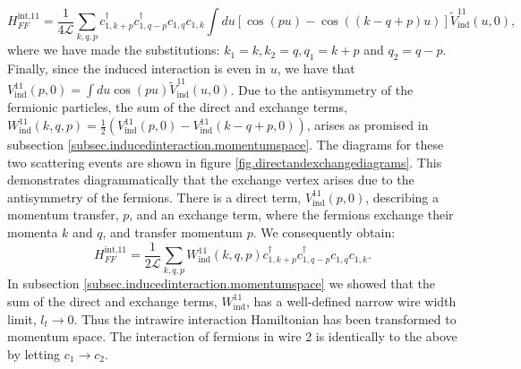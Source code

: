 \begin{equation}
H^\text{int,11}_{FF} = \frac{1}{4\mathcal{L}} \sum_{k, q, p} c^\dagger_{1, k + p}c^\dagger_{1, q - p}c_{1, q}c_{1, k} \int du\left[\cos\left(pu\right) - \cos\left(\left( k - q + p \right)u\right)\right]\tilde{V}^{11}_{\text{ind}}(u,0), \nonumber
\end{equation}
where we have made the substitutions: $k_1 = k, k_2 = q, q_1 = k + p$ and $q_2 = q - p$. Finally, since the induced interaction is even in $u$, we have that $V^{11}_{\text{ind}}(p, 0) = \int du \cos(pu) \tilde{V}^{11}_{\text{ind}}(u, 0)$. Due to the antisymmetry of the fermionic particles, the sum of the direct and exchange terms, $W^{11}_{\text{ind}}(k, q, p) = \frac{1}{2}\left( V^{11}_{\text{ind}}\left( p, 0 \right) - V^{11}_{\text{ind}}\left( k - q + p, 0 \right) \right)$, arises as promised in subsection \ref{subsec.inducedinteraction.momentumspace}. The diagrams for these two scattering events are shown in figure \ref{fig.directandexchangediagrams}. This demonstrates diagrammatically that the exchange vertex arises due to the antisymmetry of the fermions. There is a direct term, $V^{11}_\text{ind}\left( p, 0 \right)$, describing a momentum transfer, $p$, and an exchange term, where the fermions exchange their momenta $k$ and $q$, and transfer momentum $p$. We consequently obtain:
\begin{equation}
H^\text{int,11}_{FF} = \frac{1}{2\mathcal{L}} \sum_{k,q,p} W^{11}_{\text{ind}}(k, q, p) c^\dagger_{1, k + p} c^\dagger_{1, q - p} c_{1, q} c_{1, k}. 
\label{eq.H11intMomentumSpace}
\end{equation}
In subsection \ref{subsec.inducedinteraction.momentumspace} we showed that the sum of the direct and exchange terms, $W^{11}_{\text{ind}}$, has a well-defined narrow wire width limit, $l_t \to 0$. Thus the intrawire interaction Hamiltonian has been transformed to momentum space. The interaction of fermions in wire 2 is identically to the above by letting $c_1 \to c_2$.   

